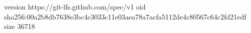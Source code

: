 version https://git-lfs.github.com/spec/v1
oid sha256:00a2b8db7638e3bc4c3033c11e03aea78a7acfa5112de4c80567c64c2fd21edf
size 36718
